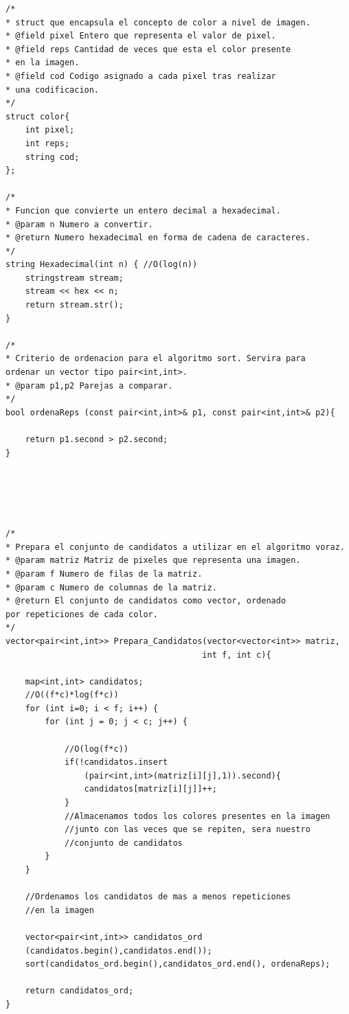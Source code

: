 \documentclass[a4paper,12pt,twoside]{article} %
\begin{document}
\lstset{language=C++}
\begin{lstlisting}
/*
* struct que encapsula el concepto de color a nivel de imagen.
* @field pixel Entero que representa el valor de pixel.
* @field reps Cantidad de veces que esta el color presente
* en la imagen.
* @field cod Codigo asignado a cada pixel tras realizar 
* una codificacion.
*/
struct color{
    int pixel;
    int reps;
    string cod;
};
	
/*
* Funcion que convierte un entero decimal a hexadecimal.
* @param n Numero a convertir.
* @return Numero hexadecimal en forma de cadena de caracteres.
*/
string Hexadecimal(int n) { //O(log(n))
    stringstream stream;
    stream << hex << n;
    return stream.str();
}

/*
* Criterio de ordenacion para el algoritmo sort. Servira para 
ordenar un vector tipo pair<int,int>.
* @param p1,p2 Parejas a comparar.
*/
bool ordenaReps (const pair<int,int>& p1, const pair<int,int>& p2){

    return p1.second > p2.second;
}





/*
* Prepara el conjunto de candidatos a utilizar en el algoritmo voraz.
* @param matriz Matriz de pixeles que representa una imagen.
* @param f Numero de filas de la matriz.
* @param c Numero de columnas de la matriz.
* @return El conjunto de candidatos como vector, ordenado 
por repeticiones de cada color.
*/
vector<pair<int,int>> Prepara_Candidatos(vector<vector<int>> matriz,
                                        int f, int c){

    map<int,int> candidatos;
    //O((f*c)*log(f*c))
    for (int i=0; i < f; i++) {
        for (int j = 0; j < c; j++) {
        
            //O(log(f*c))
            if(!candidatos.insert
                (pair<int,int>(matriz[i][j],1)).second){
                candidatos[matriz[i][j]]++;
            }
            //Almacenamos todos los colores presentes en la imagen 
            //junto con las veces que se repiten, sera nuestro
            //conjunto de candidatos
        }
    }
    
    //Ordenamos los candidatos de mas a menos repeticiones 
    //en la imagen

    vector<pair<int,int>> candidatos_ord
    (candidatos.begin(),candidatos.end());
    sort(candidatos_ord.begin(),candidatos_ord.end(), ordenaReps);

    return candidatos_ord;
}






\end{lstlisting}
\end{document}
